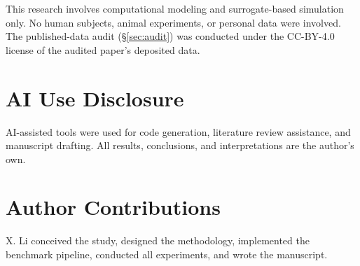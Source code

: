 \documentclass[journal]{IEEEtran}
\begin{document}
This research involves computational modeling and surrogate-based simulation
only. No human subjects, animal experiments, or personal data were involved.
The published-data audit (§\ref{sec:audit}) was conducted under the
CC-BY-4.0 license of the audited paper's deposited data.

\section*{AI Use Disclosure}

AI-assisted tools were used for code generation, literature review assistance,
and manuscript drafting. All results, conclusions, and interpretations are the
author's own.

\section*{Author Contributions}

X. Li conceived the study, designed the methodology, implemented the benchmark
pipeline, conducted all experiments, and wrote the manuscript.



\end{document}
